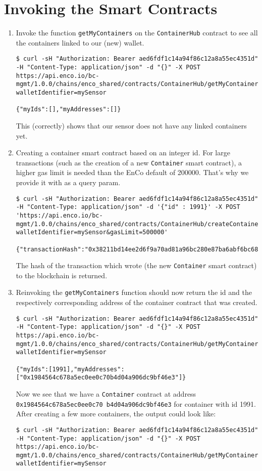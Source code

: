\documentclass[12pt]{article}
\begin{document}
\section{Invoking the Smart Contracts}
\begin{enumerate}
	\item Invoke the function \texttt{getMyContainers} on the \texttt{ContainerHub} contract to see all the containers linked to our (new) wallet.
		\begin{lstlisting}[frame=single,basicstyle=\tiny]
$ curl -sH "Authorization: Bearer aed6fdf1c14a94f86c12a8a55ec4351d" -H "Content-Type: application/json" -d "{}" -X POST https://api.enco.io/bc-mgmt/1.0.0/chains/enco_shared/contracts/ContainerHub/getMyContainers?walletIdentifier=mySensor

{"myIds":[],"myAddresses":[]}
		\end{lstlisting}
		This (correctly) shows that our sensor does not have any linked containers yet.
	\item Creating a container smart contract based on an integer id. For large transactions (such as the creation of a new \texttt{Container} smart contract), a higher gas limit is needed than the EnCo default of \num{200000}. That's why we provide it with as a query param.
		\begin{lstlisting}[frame=single,basicstyle=\tiny]
$ curl -sH "Authorization: Bearer aed6fdf1c14a94f86c12a8a55ec4351d" -H "Content-Type: application/json" -d '{"id" : 1991}' -X POST 'https://api.enco.io/bc-mgmt/1.0.0/chains/enco_shared/contracts/ContainerHub/createContainer?walletIdentifier=mySensor&gasLimit=500000'

{"transactionHash":"0x38211bd14ee2d6f9a70ad81a96bc280e87ba6abf6bc68034d25ac6f146586513"}
		\end{lstlisting}
		The hash of the transaction which wrote (the new \texttt{Container} smart contract) to the blockchain is returned.
	\item Reinvoking the \texttt{getMyContainers} function should now return the id and the respectively corresponding address of the container contract that was created.
		\begin{lstlisting}[frame=single,basicstyle=\tiny]
$ curl -sH "Authorization: Bearer aed6fdf1c14a94f86c12a8a55ec4351d" -H "Content-Type: application/json" -d "{}" -X POST https://api.enco.io/bc-mgmt/1.0.0/chains/enco_shared/contracts/ContainerHub/getMyContainers?walletIdentifier=mySensor

{"myIds":[1991],"myAddresses":["0x1984564c678a5ec0ee0c70b4d04a906dc9bf46e3"]}
		\end{lstlisting}
		Now we see that we have a \texttt{Container} contract at address \texttt{0x1984564c678a5ec0ee0c70 b4d04a906dc9bf46e3} for container with id 1991. After creating a few more containers, the output could look like:
		\begin{lstlisting}[frame=single,basicstyle=\tiny]
$ curl -sH "Authorization: Bearer aed6fdf1c14a94f86c12a8a55ec4351d" -H "Content-Type: application/json" -d "{}" -X POST https://api.enco.io/bc-mgmt/1.0.0/chains/enco_shared/contracts/ContainerHub/getMyContainers?walletIdentifier=mySensor


\end{lstlisting}
\end{enumerate}
\end{document}
